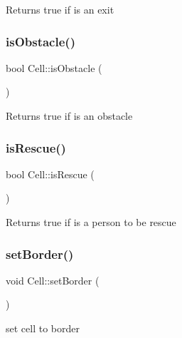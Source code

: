\begin{DoxyReturn}{Returns}
true if is an exit 
\end{DoxyReturn}
\mbox{\label{class_cell_aee32093f779b1fa761b43a6b0a86ed6c}} 
\subsubsection{\texorpdfstring{is\+Obstacle()}{isObstacle()}}
{\footnotesize\ttfamily bool Cell\+::is\+Obstacle (\begin{DoxyParamCaption}{ }\end{DoxyParamCaption})}

\begin{DoxyReturn}{Returns}
true if is an obstacle 
\end{DoxyReturn}
\mbox{\label{class_cell_ad86a719c04ff04bdf79c1c0b8e5a5942}} 
\subsubsection{\texorpdfstring{is\+Rescue()}{isRescue()}}
{\footnotesize\ttfamily bool Cell\+::is\+Rescue (\begin{DoxyParamCaption}{ }\end{DoxyParamCaption})}

\begin{DoxyReturn}{Returns}
true if is a person to be rescue 
\end{DoxyReturn}
\mbox{\label{class_cell_aa690e62809d36d512cd39ccda9cea293}} 
\subsubsection{\texorpdfstring{set\+Border()}{setBorder()}}
{\footnotesize\ttfamily void Cell\+::set\+Border (\begin{DoxyParamCaption}{ }\end{DoxyParamCaption})}

set cell to border \mbox{\label{class_cell_a86387a50a4c3f641eede253ce6cfcddb}} 
